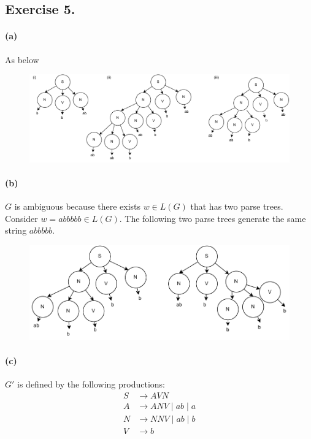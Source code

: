 \documentclass[12pt]{article}
\begin{document}
\subsection*{Exercise 5.}
\paragraph*{(a)} As below
\begin{figure}[htp!]
  \includegraphics[width = \textwidth]{ex5a.pdf}
\end{figure}

\paragraph*{(b)} \(G\) is ambiguous because there exists \(w \in L(G)\) that has two parse trees. Consider \(w = abbbbb \in L(G)\). The following two parse trees generate the same string \(abbbbb\).
\begin{figure}[htp!]
  \centering
  \includegraphics[scale = 0.9]{ex5b.pdf}
\end{figure}

\paragraph*{(c)} \(G'\) is defined by the following productions:
\begin{align*}
  S &\to AVN\\
  A &\to ANV \mid ab \mid a\\
  N &\to NNV \mid ab \mid b\\
  V &\to b
\end{align*}
\end{document}
